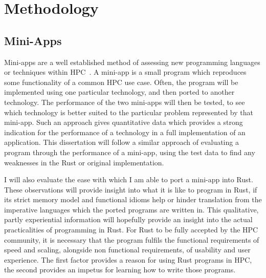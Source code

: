 \chapter{Methodology}
\section{Mini-Apps}
Mini-apps are a well established method of assessing new programming languages or techniques within HPC~\cite{Mallinson:2014, Slaughter:2015, martineau2017arch}. A mini-app is a small program which reproduces some functionality of a common HPC use case. Often, the program will be implemented using one particular technology, and then ported to another technology. The performance of the two mini-apps will then be tested, to see which technology is better suited to the particular problem represented by that mini-app. Such an approach gives quantitative data which provides a strong indication for the performance of a technology in a full implementation of an application. This dissertation will follow a similar approach of evaluating a program through the performance of a mini-app, using the test data to find any weaknesses in the Rust or original implementation.

I will also evaluate the ease with which I am able to port a mini-app into Rust. These observations will provide insight into what it is like to program in Rust, if its strict memory model and functional idioms help or hinder translation from the imperative languages which the ported programs are written in. This qualitative, partly experiential information will hopefully provide an insight into the actual practicalities of programming in Rust. For Rust to be fully accepted by the HPC community, it is necessary that the program fulfils the functional requirements of speed and scaling, alongside non functional requirements, of usability and user experience. The first factor provides a reason for using Rust programs in HPC, the second provides an impetus for learning how to write those programs.
